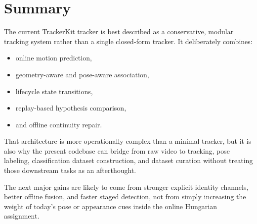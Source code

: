 \documentclass[11pt]{article}
\begin{document}
\section{Summary}

The current TrackerKit tracker is best described as a conservative, modular tracking system rather than a single closed-form tracker. It deliberately combines:

\begin{itemize}
  \item online motion prediction,
  \item geometry-aware and pose-aware association,
  \item lifecycle state transitions,
  \item replay-based hypothesis comparison,
  \item and offline continuity repair.
\end{itemize}

That architecture is more operationally complex than a minimal tracker, but it is also why the present codebase can bridge from raw video to tracking, pose labeling, classification dataset construction, and dataset curation without treating those downstream tasks as an afterthought.

The next major gains are likely to come from stronger explicit identity channels, better offline fusion, and faster staged detection, not from simply increasing the weight of today's pose or appearance cues inside the online Hungarian assignment.
\end{document}
